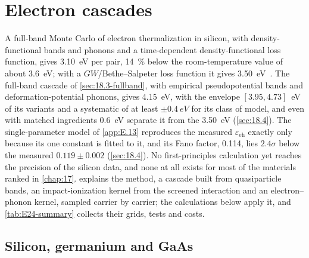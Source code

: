 \section{Electron cascades}\label{app:E.24}

A full-band Monte Carlo of electron thermalization in silicon, with density-functional bands and phonons and a time-dependent density-functional loss function, gives \SI{3.10}{eV} per pair, \SI{14}{\percent} below the room-temperature value of about \SI{3.6}{eV}; with a $GW$/Bethe--Salpeter loss function it gives \SI{3.50}{eV}~\cite[Sect.~III]{nielsen2026first}. The full-band cascade of \cref{sec:18.3-fullband}, with empirical pseudopotential bands and deformation-potential phonons, gives \SI{4.15}{eV}, with the envelope $[3.95, 4.73]$~eV of its variants and a systematic of at least $\pm\SI{0.4}{eV}$ for its class of model, and even with matched ingredients \SI{0.6}{eV} separate it from the \SI{3.50}{eV} (\cref{sec:18.4}). The single-parameter model of \cref{app:E.13} reproduces the measured $\varepsilon_{\mathrm{eh}}$ exactly only because its one constant is fitted to it, and its Fano factor, 0.114, lies $2.4\sigma$ below the measured $0.119 \pm 0.002$ (\cref{sec:18.4}). No first-principles calculation yet reaches the precision of the silicon data, and none at all exists for most of the materials ranked in \cref{chap:17}.  explains the method, a cascade built from quasiparticle bands, an impact-ionization kernel from the screened interaction and an electron--phonon kernel, sampled carrier by carrier; the calculations below apply it, and \cref{tab:E24-summary} collects their grids, tests and costs.

\subsection{Silicon, germanium and GaAs}

